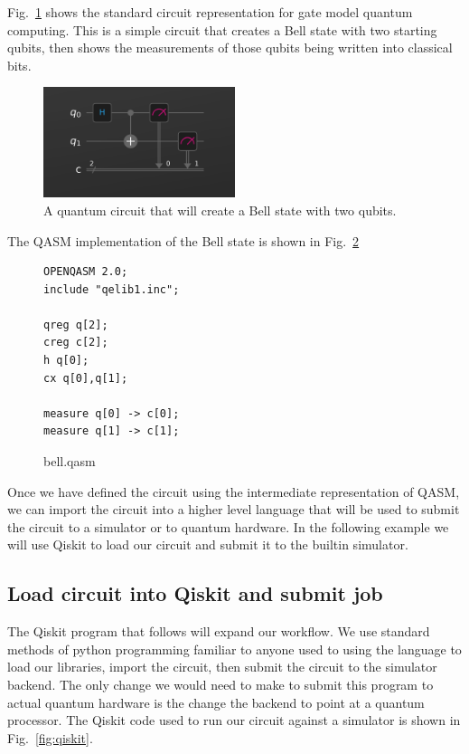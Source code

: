 \documentclass{article}
\begin{document}
Fig.~\ref{fig:bell} shows the standard circuit representation for gate model quantum computing. This is a simple circuit that creates a Bell state with two starting qubits, then shows the measurements of those qubits being written into classical bits. 
\begin{figure}[H]
    \centering
    \includegraphics[width=0.5\textwidth]{circuit.png}
    \caption{A quantum circuit that will create a Bell state with two qubits.}
    \label{fig:bell}
\end{figure}

The QASM implementation of the Bell state is shown in Fig.~\ref{fig:qasm}
\begin{samepage}
\begin{figure}[htbp]
\begin{verbatim}
OPENQASM 2.0;
include "qelib1.inc";

qreg q[2];
creg c[2];
h q[0];
cx q[0],q[1];
  
measure q[0] -> c[0];
measure q[1] -> c[1];
\end{verbatim}
\caption{bell.qasm}
\label{fig:qasm}
\end{figure}
\end{samepage}

Once we have defined the circuit using the intermediate representation of QASM, we can import the circuit into a higher level language that will be used to submit the circuit to a simulator or to quantum hardware. In the following example we will use Qiskit to load our circuit and submit it to the builtin simulator.

\subsection{Load circuit into Qiskit and submit job}

The Qiskit program that follows will expand our workflow. We use standard methods of python programming familiar to anyone used to using the language to load our libraries, import the circuit, then submit the circuit to the simulator backend. The only change we would need to make to submit this program to actual quantum hardware is the change the backend to point at a quantum processor. The Qiskit code used to run our circuit against a simulator is shown in Fig.~\ref{fig:qiskit}.
\end{document}
